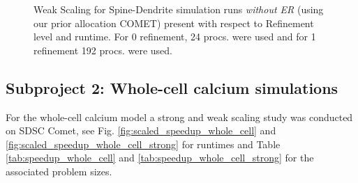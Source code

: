 \begin{figure}[H]
\centering
{}
\caption{Weak Scaling for Spine-Dendrite simulation runs \textit{without ER} (using our prior allocation COMET) present with respect to Refinement level and runtime. For 0 refinement, 24 procs. were used and for 1 refinement 192 procs. were used.}
\label{fig:spindend_weakscale}
\end{figure}


\subsection*{Subproject 2: Whole-cell calcium simulations}

For the whole-cell calcium model a strong and weak scaling study was conducted on
SDSC Comet, see Fig. 
\ref{fig:scaled_speedup_whole_cell} and \ref{fig:scaled_speedup_whole_cell_strong} for runtimes and Table 
\ref{tab:speedup_whole_cell} and \ref{tab:speedup_whole_cell_strong} for the associated problem sizes.

